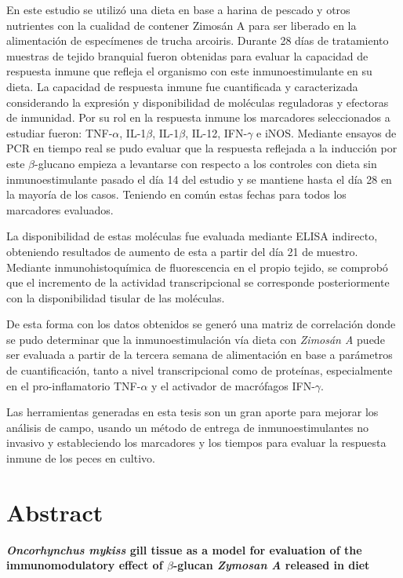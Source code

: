 \documentclass[12pt,letterpaper,oneside]{scrbook}
\begin{document}
En este estudio se utilizó una dieta en base a harina de pescado y otros
nutrientes con la cualidad de contener Zimosán A para ser liberado en la
alimentación de especímenes de trucha arcoiris. Durante 28 días de
tratamiento muestras de tejido branquial fueron obtenidas para evaluar
la capacidad de respuesta inmune que refleja el organismo con este
inmunoestimulante en su dieta. La capacidad de respuesta inmune fue
cuantificada y caracterizada considerando la expresión y disponibilidad
de moléculas reguladoras y efectoras de inmunidad. Por su rol en la
respuesta inmune los marcadores seleccionados a estudiar fueron:
TNF-\(\alpha\), IL-1\(\beta\), IL-1\(\beta\), IL-12, IFN-\(\gamma\) e
iNOS. Mediante ensayos de PCR en tiempo real se pudo evaluar que la
respuesta reflejada a la inducción por este \(\beta\)-glucano empieza a
levantarse con respecto a los controles con dieta sin inmunoestimulante
pasado el día 14 del estudio y se mantiene hasta el día 28 en la mayoría
de los casos. Teniendo en común estas fechas para todos los marcadores
evaluados.

La disponibilidad de estas moléculas fue evaluada mediante ELISA
indirecto, obteniendo resultados de aumento de esta a partir del día 21
de muestro. Mediante inmunohistoquímica de fluorescencia en el propio
tejido, se comprobó que el incremento de la actividad transcripcional se
corresponde posteriormente con la disponibilidad tisular de las
moléculas.

De esta forma con los datos obtenidos se generó una matriz de
correlación donde se pudo determinar que la inmunoestimulación vía dieta
con \emph{Zimosán A} puede ser evaluada a partir de la tercera semana de
alimentación en base a parámetros de cuantificación, tanto a nivel
transcripcional como de proteínas, especialmente en el pro-inflamatorio
TNF-\(\alpha\) y el activador de macrófagos IFN-\(\gamma\).

Las herramientas generadas en esta tesis son un gran aporte para mejorar
los análisis de campo, usando un método de entrega de inmunoestimulantes
no invasivo y estableciendo los marcadores y los tiempos para evaluar la
respuesta inmune de los peces en cultivo.

\chapter{Abstract}

\textbf{\emph{Oncorhynchus mykiss} gill tissue as a model for evaluation of the immunomodulatory effect of $\beta$-glucan \emph{Zymosan A} released in diet}
\end{document}
